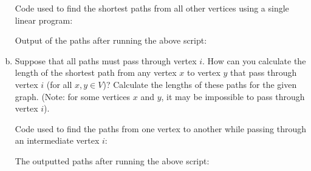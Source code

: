 \documentclass[../report/main.tex]{subfiles}
\begin{document}
\begin{enumerate}[a)]
    Code used to find the shortest paths from all other vertices using a single linear program:

    

    Output of the paths after running the above script:

    

	\item Suppose that all paths must pass through vertex $i$. How can you calculate the length of the shortest path from any vertex $x$ to vertex $y$ that pass through vertex $i$ (for all $x, y \in V$)? Calculate the lengths of these paths for the given graph. (Note: for some vertices $x$ and $y$, it may be impossible to pass through vertex $i$).

    Code used to find the paths from one vertex to another while passing through an intermediate vertex $i$:

    

    The outputted paths after running the above script:

    
\end{enumerate}
\end{document}
